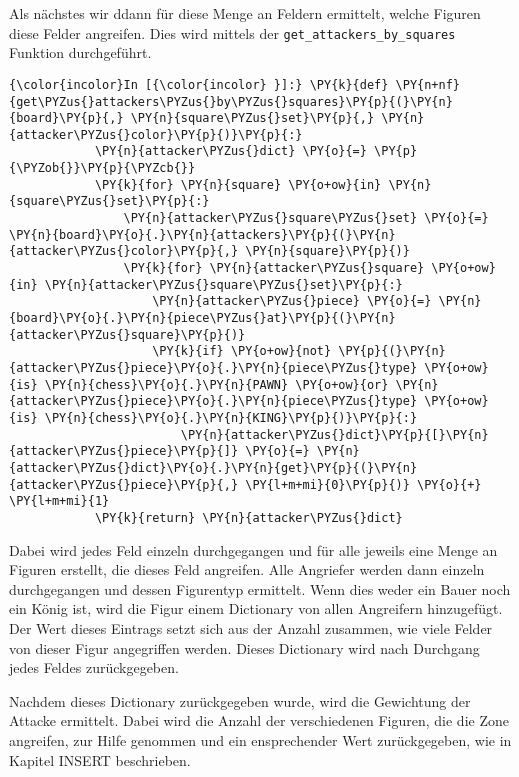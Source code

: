 Als nächstes wir ddann für diese Menge an Feldern ermittelt, welche
Figuren diese Felder angreifen. Dies wird mittels der
\texttt{get\_attackers\_by\_squares} Funktion durchgeführt.

    \begin{Verbatim}[commandchars=\\\{\}]
{\color{incolor}In [{\color{incolor} }]:} \PY{k}{def} \PY{n+nf}{get\PYZus{}attackers\PYZus{}by\PYZus{}squares}\PY{p}{(}\PY{n}{board}\PY{p}{,} \PY{n}{square\PYZus{}set}\PY{p}{,} \PY{n}{attacker\PYZus{}color}\PY{p}{)}\PY{p}{:}
            \PY{n}{attacker\PYZus{}dict} \PY{o}{=} \PY{p}{\PYZob{}}\PY{p}{\PYZcb{}}
            \PY{k}{for} \PY{n}{square} \PY{o+ow}{in} \PY{n}{square\PYZus{}set}\PY{p}{:}
                \PY{n}{attacker\PYZus{}square\PYZus{}set} \PY{o}{=} \PY{n}{board}\PY{o}{.}\PY{n}{attackers}\PY{p}{(}\PY{n}{attacker\PYZus{}color}\PY{p}{,} \PY{n}{square}\PY{p}{)}
                \PY{k}{for} \PY{n}{attacker\PYZus{}square} \PY{o+ow}{in} \PY{n}{attacker\PYZus{}square\PYZus{}set}\PY{p}{:}
                    \PY{n}{attacker\PYZus{}piece} \PY{o}{=} \PY{n}{board}\PY{o}{.}\PY{n}{piece\PYZus{}at}\PY{p}{(}\PY{n}{attacker\PYZus{}square}\PY{p}{)}
                    \PY{k}{if} \PY{o+ow}{not} \PY{p}{(}\PY{n}{attacker\PYZus{}piece}\PY{o}{.}\PY{n}{piece\PYZus{}type} \PY{o+ow}{is} \PY{n}{chess}\PY{o}{.}\PY{n}{PAWN} \PY{o+ow}{or} \PY{n}{attacker\PYZus{}piece}\PY{o}{.}\PY{n}{piece\PYZus{}type} \PY{o+ow}{is} \PY{n}{chess}\PY{o}{.}\PY{n}{KING}\PY{p}{)}\PY{p}{:}
                        \PY{n}{attacker\PYZus{}dict}\PY{p}{[}\PY{n}{attacker\PYZus{}piece}\PY{p}{]} \PY{o}{=} \PY{n}{attacker\PYZus{}dict}\PY{o}{.}\PY{n}{get}\PY{p}{(}\PY{n}{attacker\PYZus{}piece}\PY{p}{,} \PY{l+m+mi}{0}\PY{p}{)} \PY{o}{+} \PY{l+m+mi}{1}
            \PY{k}{return} \PY{n}{attacker\PYZus{}dict}
\end{Verbatim}

    Dabei wird jedes Feld einzeln durchgegangen und für alle jeweils eine
Menge an Figuren erstellt, die dieses Feld angreifen. Alle Angriefer
werden dann einzeln durchgegangen und dessen Figurentyp ermittelt. Wenn
dies weder ein Bauer noch ein König ist, wird die Figur einem Dictionary
von allen Angreifern hinzugefügt. Der Wert dieses Eintrags setzt sich
aus der Anzahl zusammen, wie viele Felder von dieser Figur angegriffen
werden. Dieses Dictionary wird nach Durchgang jedes Feldes
zurückgegeben.

Nachdem dieses Dictionary zurückgegeben wurde, wird die Gewichtung der
Attacke ermittelt. Dabei wird die Anzahl der verschiedenen Figuren, die
die Zone angreifen, zur Hilfe genommen und ein ensprechender Wert
zurückgegeben, wie in Kapitel INSERT beschrieben.

